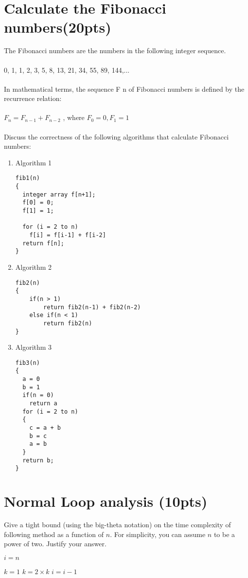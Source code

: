 \documentclass{article}[12pt]
\begin{document}
\section{Calculate the Fibonacci numbers(20pts)}
The Fibonacci numbers are the numbers in the following integer sequence. \\ \\
0, 1, 1, 2, 3, 5, 8, 13, 21, 34, 55, 89, 144,... \\ \\
In mathematical terms, the sequence F n of Fibonacci numbers is defined by the recurrence relation: \\ \\
$F_n = F_{n-1} + F_{n-2}$ , where $F_0 = 0,F_1 = 1$ \\ \\
Discuss the correctness of the following algorithms that calculate Fibonacci numbers:
\begin{enumerate}
\item {Algorithm 1}
\begin{lstlisting}
fib1(n)
{
  integer array f[n+1];
  f[0] = 0;
  f[1] = 1;

  for (i = 2 to n)
    f[i] = f[i-1] + f[i-2]
  return f[n];
}
\end{lstlisting}
\item {Algorithm 2}
\begin{lstlisting}
fib2(n)
{
    if(n > 1)
        return fib2(n-1) + fib2(n-2)
    else if(n < 1)
        return fib2(n)
}
\end{lstlisting}
\item {Algorithm 3}
\begin{lstlisting}
fib3(n)
{
  a = 0
  b = 1
  if(n = 0)
    return a
  for (i = 2 to n)
  {
	c = a + b
	b = c
	a = b
  }
  return b;
}
\end{lstlisting}
\end{enumerate}

\section{Normal Loop analysis (10pts)}

Give a tight bound (using the big-theta notation) on the time complexity of following method as a function of $n$. For simplicity, you can assume $n$ to be a power of two. Justify your answer.

\hfill \break

\begin{algorithmic}
\State $i = n$

        \State $k = 1$
            \State $k = 2 \times k$
        \EndWhile
    \EndFor
    \State $i = i - 1$
\EndWhile
\EndFunction
\end{algorithmic}
\end{document}
